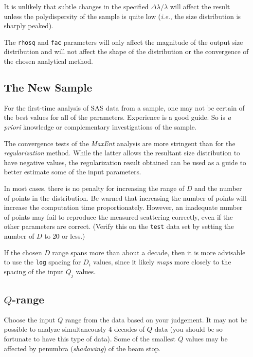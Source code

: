 \documentclass[letterpaper]{article}
\begin{document}
It is unlikely that subtle changes in the specified
$\Delta\lambda/\lambda$ will affect the result unless the 
polydispersity of the sample is quite low (\emph{i.e.}, 
the size distribution is sharply peaked).

The \texttt{rhosq} and \texttt{fac} parameters will 
only affect the magnitude 
of the output size distribution and will not affect the 
shape of the distribution or the convergence of the chosen 
analytical method.

\subsection{The New Sample}

For the first-time analysis of SAS data from a sample, one 
may not be certain of the best values for all of the 
parameters.  Experience is a good guide.  So is \emph{a 
priori} knowledge or complementary investigations of the 
sample.

The convergence tests of the \emph{MaxEnt} analysis are 
more stringent than for the \emph{regularization} method.
While the latter allows the resultant size distribution to 
have negative values, the regularization result obtained 
can be used as a guide to 
better estimate some of the input parameters.

In most cases, there is no penalty for increasing the 
range of $D$ and the number of points in the 
distribution.  Be warned that increasing the number of points
will increase the computation time proportionately.  
However, an inadequate number of points may fail to 
reproduce the measured scattering correctly, even if the 
other parameters are correct.  (Verify this on the 
\texttt{test} data set by setting the number of $D$ to 20 or 
less.)

If the chosen $D$ range spans more than about a 
decade, then it is more advisable to use the \texttt{log} 
spacing for $D_i$ values, since it likely \emph{maps} more closely 
to the spacing of the input $Q_j$ values.

\subsection{$Q$-range}

Choose the input $Q$ range from the data based on your 
judgement.  It may not be possible to analyze simultaneously 
4 decades of 
$Q$ data (you should be so fortunate to have this type 
of data).  Some of the smallest $Q$ values may be affected 
by penumbra (\emph{shadowing}) of the beam stop.
\end{document}

